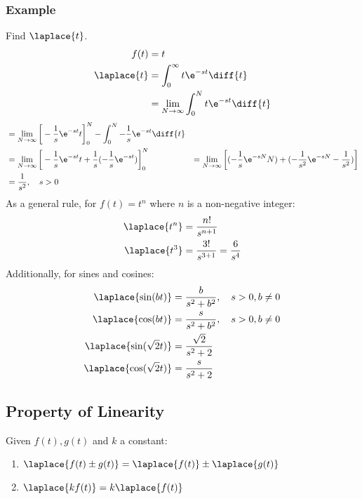 \documentclass{math}
\begin{document}
\subsubsection*{Example}
Find \( \laplace{t} \).
\begin{align*}
  f(t) &= t \\
  \laplace{t} &= \int_{0}^{\infty}t\e^{-st}\diff{t} \\
  &= \lim_{N\to\infty}\int_{0}^{N}t\e^{-st}\diff{t} \\
\end{align*}
\begin{align*}
  &= \lim_{N\to\infty}\bigg[-\frac{1}{s}\e^{-st}t\bigg]_{0}^{N}-
    \int_{0}^{N}-\frac{1}{s}\e^{-st}\diff{t} \\
  &= \lim_{N\to\infty}\bigg[
    -\frac{1}{s}\e^{-st}t+\frac{1}{s}(-\frac{1}{s}\e^{-st})\bigg]_{0}^{N}
  &= \lim_{N\to\infty}\bigg[
    (-\frac{1}{s}\e^{-sN}N)+(-\frac{1}{s^2}\e^{-sN}-\frac{1}{s^2})\bigg] \\
  &= \frac{1}{s^2}, \quad s>0
\end{align*}
As a general rule, for \( f(t) = t^n \) where \( n \) is a non-negative integer:
\begin{align*}
  \laplace{t^n} &= \frac{n!}{s^{n+1}} \\
  \laplace{t^3} &= \frac{3!}{s^{3+1}} = \frac{6}{s^4}
\end{align*}
Additionally, for sines and cosines:
\begin{align*}
  \laplace{\sin(bt)} &= \frac{b}{s^2+b^2}, \quad s>0,b\ne0 \\
  \laplace{\cos(bt)} &= \frac{s}{s^2+b^2}, \quad s>0,b\ne0 \\
  \laplace{\sin(\sqrt{2}t)} &= \frac{\sqrt{2}}{s^2+2} \\
  \laplace{\cos(\sqrt{2}t)} &= \frac{s}{s^2+2}
\end{align*}

\subsection*{Property of Linearity}
Given \( f(t),g(t) \) and \( k \) a constant:
\begin{enumerate}
  \item \( \laplace{f(t)\pm g(t)} = \laplace{f(t)}\pm\laplace{g(t)} \)
  \item \( \laplace{kf(t)} = k\laplace{f(t)} \)
\end{enumerate}
\end{document}
